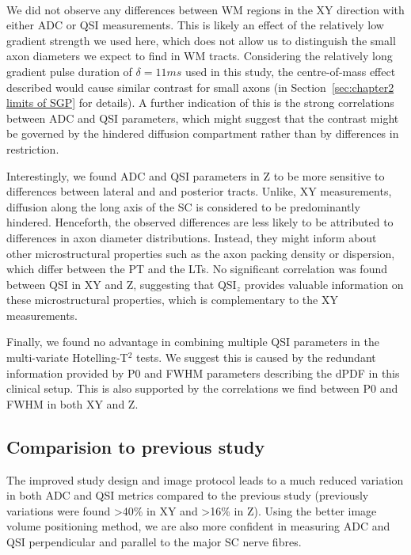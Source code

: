 \paragraph{} We did not observe any differences between WM regions in the XY direction with either ADC or QSI measurements. This is likely an effect of the relatively low gradient strength we used here,  which does not allow us to distinguish the small axon diameters we expect to find in WM tracts. Considering the relatively long gradient pulse duration of $\delta=11ms$ used in this study, the centre-of-mass effect described would cause similar contrast for small axons (in Section~\ref{sec:chapter2 limits of SGP} for details). A further indication of this is the strong correlations between ADC and QSI parameters, which might suggest that the contrast might be governed by the hindered diffusion compartment rather than by differences in restriction.

Interestingly, we found ADC and QSI parameters in Z to be more sensitive to differences between lateral and and posterior tracts. Unlike, XY measurements, diffusion along the long axis of the SC is considered to be predominantly hindered. Henceforth, the observed differences are less likely to be attributed to differences in axon diameter distributions. Instead, they might inform about other microstructural properties such as the axon packing density or dispersion, which differ between the PT and the LTs. No significant correlation was found between QSI in XY and Z, suggesting that QSI$_z$ provides valuable information on these microstructural properties, which is complementary to the XY measurements.

Finally, we found no advantage in combining multiple QSI parameters in the multi-variate Hotelling-T$^2$ tests. We suggest this is caused by the redundant information provided by P0 and FWHM parameters describing the \gls{dPDF} in this clinical setup. This is also supported by the correlations we find between P0 and FWHM in both XY and Z.

\subsection{Comparision to previous study}
The improved study design and image protocol leads to a much reduced variation in both ADC and QSI metrics compared to the previous study (previously variations were found >40\% in XY and >16\% in Z). Using the better image volume positioning method, we are also more confident in measuring ADC and QSI perpendicular and parallel to the major \gls{SC} nerve fibres.


